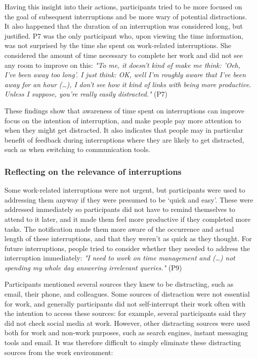 Having this insight into their actions, participants tried to be more focused on the goal of subsequent interruptions and be more wary of potential distractions. It also happened that the duration of an interruption was considered long, but justified. P7 was the only participant who, upon viewing the time information, was not surprised by the time she spent on work-related interruptions. She considered the amount of time necessary to complete her work and did not see any room to improve on this: \textit{"To me, it doesn't kind of make me think: 'Oeh, I've been away too long'. I just think: OK, well I'm roughly aware that I've been away for an hour (…), I don't see how it kind of links with being more productive. Unless I suppose, you're really easily distracted."} (P7)

These findings show that awareness of time spent on interruptions can improve focus on the intention of interruption, and make people pay more attention to when they might get distracted. It also indicates that people may in particular benefit of feedback during interruptions where they are likely to get distracted, such as when switching to communication tools. 

\subsubsection{Reflecting on the relevance of interruptions}
Some work-related interruptions were not urgent, but participants were used to addressing them anyway if they were presumed to be ‘quick and easy’. These were addressed immediately so participants did not have to remind themselves to attend to it later, and it made them feel more productive if they completed more tasks. The notification made them more aware of the occurrence and actual length of these interruptions, and that they weren’t as quick as they thought. For future interruptions, people tried to consider whether they needed to address the interruption immediately:  \textit{"I need to work on time management and (…) not spending my whole day answering irrelevant queries."} (P9)

Participants mentioned several sources they knew to be distracting, such as email, their phone, and colleagues. Some sources of distraction were not essential for work, and generally participants did not self-interrupt their work often with the intention to access these sources: for example, several participants said they did not check social media at work. However, other distracting sources were used both for work and non-work purposes, such as search engines, instant messaging tools and email. It was therefore difficult to simply eliminate these distracting sources from the work environment:

